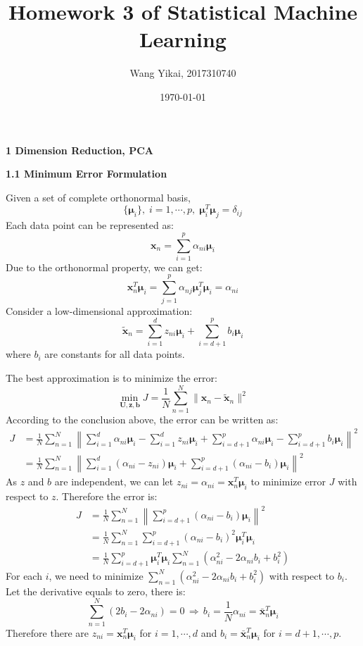 \documentclass[12pt]{article}
\title{Homework 3 of Statistical Machine Learning}
\author{Wang Yikai, 2017310740}
\date{\today}
\begin{document}
\maketitle

{\large \bf 1 Dimension Reduction, PCA}
\bigskip \par
{\bf 1.1 Minimum Error Formulation}
\bigskip \par
Given a set of complete orthonormal basis, 
$$\{{\bm\mu}_i\},\;i=1,\cdots,p,\;{\bm\mu}_i^T{\bm\mu}_j=\delta_{ij}$$
Each data point can be represented as:
$${\bm x}_n=\sum_{i=1}^p \alpha_{ni}{\bm\mu}_i$$
Due to the orthonormal property, we can get:
$${\bm x}_n^T{\bm\mu}_i=\sum_{j=1}^p \alpha_{nj}{\bm\mu}_j^T{\bm\mu}_i=\alpha_{ni}$$
Consider a low-dimensional approximation:
$${\tilde{\bm x}}_n=\sum_{i=1}^d z_{ni}{\bm\mu}_i+\sum_{i=d+1}^p b_{i}{\bm\mu}_i$$
where $b_{i}$ are constants for all data points.
\par The best approximation is to minimize the error:
$$\min_{\bm{U},\bm{z},\bm{b}}J=\frac{1}{N}\sum_{n=1}^N\|{\bm x}_n-{\tilde{\bm x}}_n\|^2$$
According to the conclusion above, the error can be written as:
\begin{align*}
J&=\frac{1}{N}\sum_{n=1}^N\left\|\sum_{i=1}^d \alpha_{ni}{\bm\mu}_i-\sum_{i=1}^d z_{ni}{\bm\mu}_i+\sum_{i=d+1}^p \alpha_{ni}{\bm\mu}_i-\sum_{i=d+1}^p b_{i}{\bm\mu}_i\right\|^2\\
&=\frac{1}{N}\sum_{n=1}^N\left\|\sum_{i=1}^d \left(\alpha_{ni}-z_{ni}\right){\bm\mu}_i+\sum_{i=d+1}^p \left(\alpha_{ni}-b_{i}\right){\bm\mu}_i\right\|^2
\end{align*}
As $z$ and $b$ are independent, we can let $z_{ni}=\alpha_{ni}={\bm x}_n^T{\bm\mu}_i$ to minimize error $J$ with respect to $z$. Therefore the error is:
\begin{align*}
J&=\frac{1}{N}\sum_{n=1}^N\left\|\sum_{i=d+1}^p \left(\alpha_{ni}-b_{i}\right){\bm\mu}_i\right\|^2\\
&=\frac{1}{N}\sum_{n=1}^N\sum_{i=d+1}^p \left(\alpha_{ni}-b_{i}\right)^2{\bm\mu}_i^T{\bm\mu}_i\\
&=\frac{1}{N}\sum_{i=d+1}^p{\bm\mu}_i^T{\bm\mu}_i\sum_{n=1}^N\left(\alpha_{ni}^2-2\alpha_{ni}b_i+b_i^2\right)
\end{align*}
For each $i$, we need to minimize $\sum_{n=1}^N\left(\alpha_{ni}^2-2\alpha_{ni}b_i+b_i^2\right)$ with respect to $b_i$. Let the derivative equals to zero, there is:
$$\sum_{n=1}^N\left(2b_i-2\alpha_{ni}\right)=0\,\Rightarrow\,b_i=\frac{1}{N}\alpha_{ni}={\bar{\bm x}}_n^T{\bm\mu}_i$$ 
Therefore there are $z_{ni}={\bm x}_n^T{\bm\mu}_i$ for $i=1,\cdots,d$ and $b_i={\bar{\bm x}}_n^T{\bm\mu}_i$ for $i=d+1,\cdots,p$.
\end{document}
